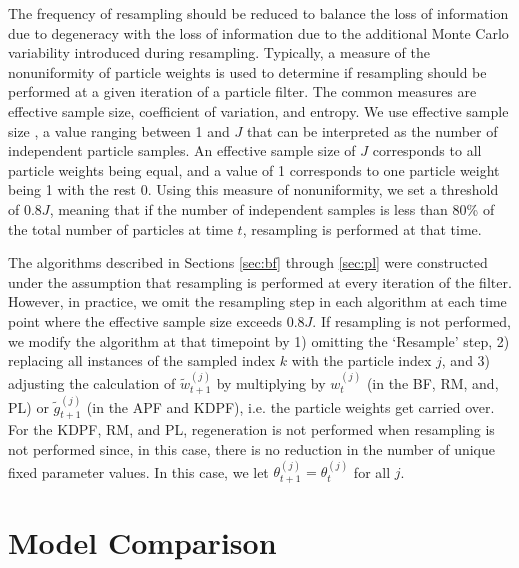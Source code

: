 The frequency of resampling should be reduced to balance the loss of information due to degeneracy with the loss of information due to the additional Monte Carlo variability introduced during resampling. Typically, a measure of the nonuniformity of particle weights is used to determine if resampling should be performed at a given iteration of a particle filter. The common measures are effective sample size, coefficient of variation, and entropy. We use effective sample size \citep{Liu:Chen:Wong:reje:1998}, a value ranging between 1 and $J$ that can be interpreted as the number of independent particle samples. An effective sample size of $J$ corresponds to all particle weights being equal, and a value of 1 corresponds to one particle weight being 1 with the rest 0. Using this measure of nonuniformity, we set a threshold of $0.8J$, meaning that if the number of independent samples is less than 80\% of the total number of particles at time $t$, resampling is performed at that time.

The algorithms described in Sections \ref{sec:bf} through \ref{sec:pl} were constructed under the assumption that resampling is performed at every iteration of the filter. However, in practice, we omit the resampling step in each algorithm at each time point where the effective sample size exceeds $0.8J$. If resampling is not performed, we modify the algorithm at that timepoint by 1) omitting the `Resample' step, 2) replacing all instances of the sampled index $k$ with the particle index $j$, and 3) adjusting the calculation of $\tilde{w}_{t+1}^{(j)}$ by multiplying by $w_t^{(j)}$ (in the BF, RM, and, PL) or $\tilde{g}^{(j)}_{t+1}$ (in the APF and KDPF), i.e. the particle weights get carried over. For the KDPF, RM, and PL, regeneration is not performed when resampling is not performed since, in this case, there is no reduction in the number of unique fixed parameter values. In this case, we let $\theta_{t+1}^{(j)} = \theta_t^{(j)}$ for all $j$.

\section{Model Comparison \label{sec:comp}}

